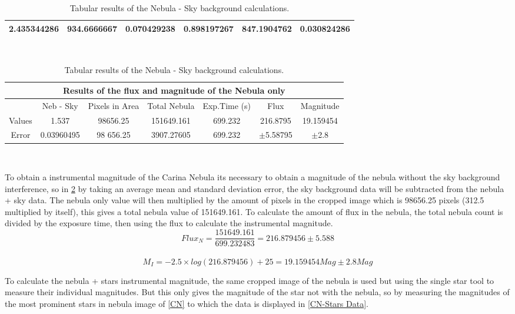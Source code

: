 \documentclass[12pt]{article}
\begin{document}
\begin{table}[H]
\begin{center}
\begin{tabular}{|c|c|c||c|c|c|}
 \hline \hline
 \textbf{2.435344286}	& \textbf{934.6666667} &	\textbf{0.070429238}	&	\textbf{0.898197267} & \textbf{ 847.1904762} & \textbf{0.030824286}\\
 \hline
 \end{tabular} \\ [0.5cm]
 \begin{tabular}{|c||c|c|c|c|c||c|}
 \hline
 \multicolumn{7}{|c|}{Results of the flux and magnitude of the Nebula only} \\
 \hline \hline
   & Neb - Sky & Pixels in Area & Total Nebula & Exp.Time (s) & Flux & Magnitude \\ 
 \hline
 Values & 1.537 & 98656.25 & 151649.161 & 699.232 & 216.8795 & 19.159454 \\
 \hline
 Error & 0.03960495 & 98 656.25 & 3907.27605 & 699.232 & $\pm$5.58795 & $\pm$2.8 \\ 
 \hline
 \end{tabular} \\ 
 \caption{Tabular results of the Nebula - Sky background calculations.}
 \label{CN-Sky Data}
\end{center}
\end{table} 

To obtain a instrumental magnitude of the Carina Nebula its necessary to obtain a magnitude of the nebula without the sky background interference, so in \cref{CN-Sky Data} by taking an average mean and standard deviation error, the sky background data will be subtracted from the nebula + sky data. The nebula only value will then multiplied by the amount of pixels in the cropped image which is 98656.25 pixels (312.5 multiplied by itself), this gives a total nebula value of 151649.161. To calculate the amount of flux in the nebula, the total nebula count is divided by the exposure time, then using the flux to calculate the instrumental magnitude. \\

\begin{equation}
Flux_N = \dfrac{151649.161}{699.232483} = 216.879456 \pm 5.588
\end{equation} \\

\begin{equation}
M_I = -2.5 \times log(216.879456) + 25 = 19.159454 Mag \pm 2.8 Mag
\end{equation}

To calculate the nebula + stars instrumental magnitude, the same cropped image of the nebula is used but using the single star tool to measure their individual magnitudes. But this only gives the magnitude of the star not with the nebula, so by measuring the magnitudes of the most prominent stars in nebula image of \cref{CN} to which the data is displayed in \cref{CN-Stars Data}. 
\end{document}
